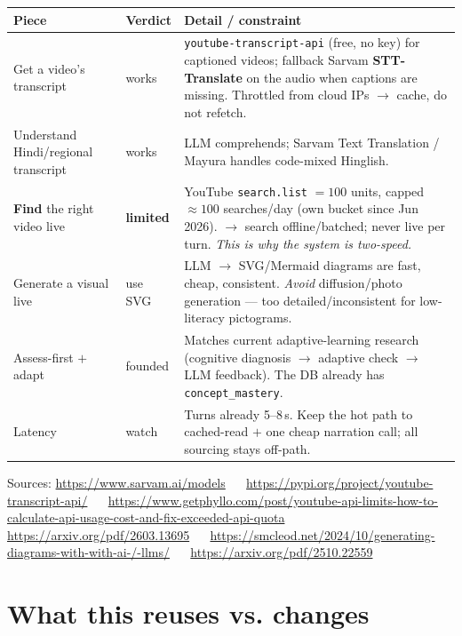 \documentclass[11pt]{article}
\newcommand{\code}[1]{\texttt{#1}}
\begin{document}
\begin{center}
\renewcommand{\arraystretch}{1.25}
\begin{tabular}{p{3.4cm} p{1.7cm} p{7.2cm}}
\toprule
\textbf{Piece} & \textbf{Verdict} & \textbf{Detail / constraint} \\
\midrule
Get a video's transcript & works & \code{youtube-transcript-api} (free, no key) for captioned
videos; fallback Sarvam \textbf{STT-Translate} on the audio when captions are missing. Throttled
from cloud IPs $\rightarrow$ cache, do not refetch. \\
Understand Hindi/regional transcript & works & LLM comprehends; Sarvam Text Translation / Mayura
handles code-mixed Hinglish. \\
\textbf{Find} the right video live & \textbf{limited} & YouTube \code{search.list} $=100$ units,
capped $\approx100$ searches/day (own bucket since Jun 2026). $\rightarrow$ search offline/batched;
never live per turn. \emph{This is why the system is two-speed.} \\
Generate a visual live & use SVG & LLM $\to$ SVG/Mermaid diagrams are fast, cheap, consistent.
\emph{Avoid} diffusion/photo generation --- too detailed/inconsistent for low-literacy pictograms. \\
Assess-first $+$ adapt & founded & Matches current adaptive-learning research (cognitive diagnosis
$\to$ adaptive check $\to$ LLM feedback). The DB already has \code{concept\_mastery}. \\
Latency & watch & Turns already 5--8\,s. Keep the hot path to cached-read $+$ one cheap narration
call; all sourcing stays off-path. \\
\bottomrule
\end{tabular}
\end{center}

\noindent\footnotesize Sources: \url{https://www.sarvam.ai/models} ~\textbullet~
\url{https://pypi.org/project/youtube-transcript-api/} ~\textbullet~
\url{https://www.getphyllo.com/post/youtube-api-limits-how-to-calculate-api-usage-cost-and-fix-exceeded-api-quota}
~\textbullet~ \url{https://arxiv.org/pdf/2603.13695} ~\textbullet~
\url{https://smcleod.net/2024/10/generating-diagrams-with-with-ai-/-llms/} ~\textbullet~
\url{https://arxiv.org/pdf/2510.22559}
\normalsize

\section{What this reuses vs. changes}
\end{document}
